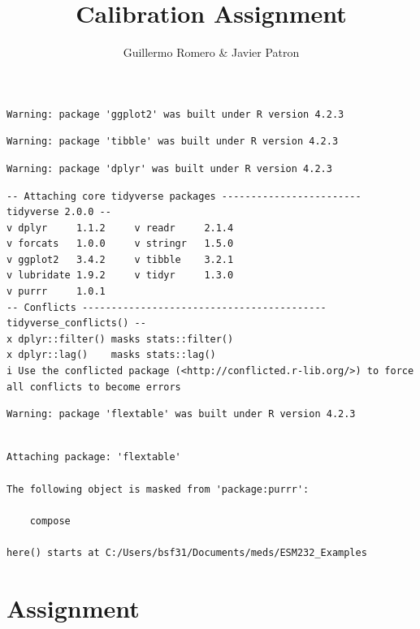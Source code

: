 \documentclass[
  letterpaper,
  DIV=11,
  numbers=noendperiod]{scrartcl}
\title{Calibration Assignment}
\author{Guillermo Romero \& Javier Patron}
\date{}
\begin{document}
\maketitle
\ifdefined\Shaded\renewenvironment{Shaded}{\begin{tcolorbox}[frame hidden, borderline west={3pt}{0pt}{shadecolor}, interior hidden, breakable, enhanced, boxrule=0pt, sharp corners]}{\end{tcolorbox}}\fi

\begin{verbatim}
Warning: package 'ggplot2' was built under R version 4.2.3
\end{verbatim}

\begin{verbatim}
Warning: package 'tibble' was built under R version 4.2.3
\end{verbatim}

\begin{verbatim}
Warning: package 'dplyr' was built under R version 4.2.3
\end{verbatim}

\begin{verbatim}
-- Attaching core tidyverse packages ------------------------ tidyverse 2.0.0 --
v dplyr     1.1.2     v readr     2.1.4
v forcats   1.0.0     v stringr   1.5.0
v ggplot2   3.4.2     v tibble    3.2.1
v lubridate 1.9.2     v tidyr     1.3.0
v purrr     1.0.1     
-- Conflicts ------------------------------------------ tidyverse_conflicts() --
x dplyr::filter() masks stats::filter()
x dplyr::lag()    masks stats::lag()
i Use the conflicted package (<http://conflicted.r-lib.org/>) to force all conflicts to become errors
\end{verbatim}

\begin{verbatim}
Warning: package 'flextable' was built under R version 4.2.3
\end{verbatim}

\begin{verbatim}

Attaching package: 'flextable'

The following object is masked from 'package:purrr':

    compose

here() starts at C:/Users/bsf31/Documents/meds/ESM232_Examples
\end{verbatim}

\hypertarget{assignment}{%
\section{\texorpdfstring{\textbf{Assignment}}{Assignment}}\label{assignment}}
\end{document}
